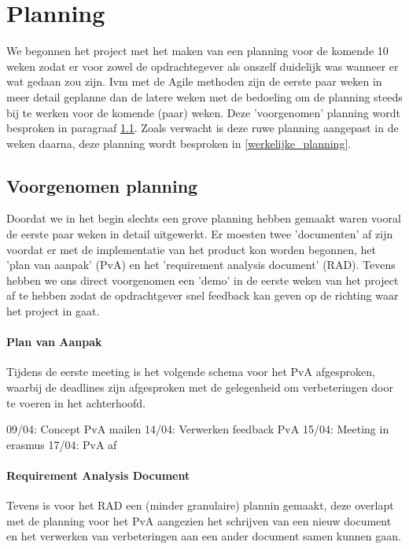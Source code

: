 \section{Planning}
\label{Planning}

We begonnen het project met het maken van een planning voor de komende 10 weken
zodat er voor zowel de opdrachtegever als onszelf duidelijk was wanneer er wat
gedaan zou zijn. Ivm met de Agile methoden zijn de eerste paar weken in meer
detail geplanne dan de latere weken met de bedoeling om de planning steeds bij
te werken voor de komende (paar) weken. Deze 'voorgenomen' planning wordt
besproken in paragraaf \ref{voorgenomen_planning}. Zoals verwacht is deze ruwe
planning aangepast in de weken daarna, deze planning wordt besproken in
\ref{werkelijke_planning}.

\subsection{Voorgenomen planning}
\label{voorgenomen_planning}

Doordat we in het begin slechts een grove planning hebben gemaakt waren vooral
de eerste paar weken in detail uitgewerkt. Er moesten twee 'documenten' af zijn
voordat er met de implementatie van het product kon worden begonnen, het 'plan
van aanpak' (PvA) en het 'requirement analysis document' (RAD). Tevens hebben
we ons direct voorgenomen een 'demo' in de eerste weken van het project af te
hebben zodat de opdrachtgever snel feedback kan geven op de richting waar het
project in gaat.

\paragraph{Plan van Aanpak}

Tijdens de eerste meeting is het volgende schema voor het PvA afgesproken,
waarbij de deadlines zijn afgesproken met de gelegenheid om verbeteringen
door te voeren in het achterhoofd.

09/04: Concept PvA mailen
14/04: Verwerken feedback PvA
15/04: Meeting in erasmus
17/04: PvA af

\paragraph{Requirement Analysis Document}

Tevens is voor het RAD een (minder granulaire) plannin gemaakt, deze overlapt
met de planning voor het PvA aangezien het schrijven van een nieuw document en
het verwerken van verbeteringen aan een ander document samen kunnen gaan.

